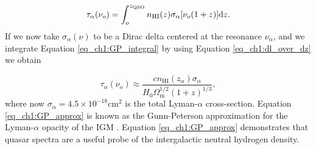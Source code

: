 \begin{equation}\label{eq_ch1:GP_integral}
    \tau_\alpha(\nu_o)=\int_o^{z_\text{QSO}} n_\text{HI}(z) \sigma_\alpha[\nu_o(1+z)] \differential z.
\end{equation}
If we now take $\sigma_\alpha(\nu)$ to be a Dirac delta centered at the resonance $\nu_\alpha$, and we integrate Equation \ref{eq_ch1:GP_integral} by using Equation \ref{eq_ch1:dl_over_dz} we obtain

\begin{equation}\label{eq_ch1:GP_approx}
    \tau_\alpha(\nu_o)\approx \frac{cn_\text{HI}(z_\alpha)\sigma_\alpha}{H_0\Omega_\text{m}^{1/2} (1+z)^{1/3}},
\end{equation}
where now $\sigma_\alpha=4.5 \times 10^{-18}$cm$^2$ is the total Lyman-$\alpha$ cross-section.
Equation \ref{eq_ch1:GP_approx} is known as the Gunn-Peterson approximation for the Lyman-$\alpha$ opacity of the IGM \cite{GunnPeterson}. Equation \ref{eq_ch1:GP_approx} demonstrates that quasar spectra are a useful probe of the intergalactic neutral hydrogen density.





